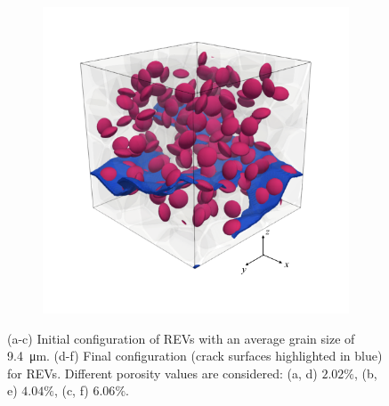 \begin{figure}[!htbp]
\begin{subfigure}{0.32\textwidth}
    \caption{}
    \label{b100_end}
  \end{subfigure}
  \begin{subfigure}{0.32\textwidth}
    \centering
    \includegraphics[width=\textwidth]{Chapter3/figures/b150_end}
    \caption{}
    \label{b150_end}
  \end{subfigure}
  \caption[Crack propagation in REVs with different porosity values.]{ (a-c) Initial configuration of REVs with an average grain size of \SI{9.4}{\micro\meter}. (d-f) Final configuration (crack surfaces highlighted in blue) for REVs. Different porosity values are considered: (a, d) $2.02\%$, (b, e) $4.04\%$, (c, f) $6.06\%$. }
  \label{ini_final_porosity}
\end{figure}

